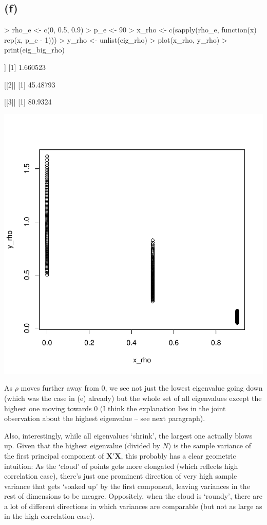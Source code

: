\documentclass[a4paper,12pt,twoside]{article}
\begin{document}
\subsection*{(f)}


\begin{Schunk}
\begin{Sinput}
> rho_e <- c(0, 0.5, 0.9)
> p_e <- 90
> x_rho <- c(sapply(rho_e, function(x) rep(x, p_e - 1)))
> y_rho <- unlist(eig_rho)
> plot(x_rho, y_rho)
> print(eig_big_rho)
\end{Sinput}
\begin{Soutput}
[[1]]
[1] 1.660523

[[2]]
[1] 45.48793

[[3]]
[1] 80.9324
\end{Soutput}
\end{Schunk}
\includegraphics{ps1-plot1}

As $\rho$ moves further away from $0$, we see not just the lowest eigenvalue 
going down (which was the case in (e) already) but the whole set of all eigenvalues 
except the highest one moving towards $0$ (I think the explanation lies
in the joint observation about the highest eigenvalue -- see next paragraph).

Also, interestingly, while all eigenvalues `shrink', the largest one actually blows up. 
Given that the highest eigenvalue (divided by $N$) is the sample variance of 
the first principal component of $\mathbf{X}' \mathbf{X}$, this probably has 
a clear geometric intuition: As the `cloud' of points gets more elongated 
(which reflects high correlation case), there's just one prominent direction of 
very high sample variance that gets `soaked up' by the first component,
leaving variances in the rest of dimensions to be meagre. Oppositely, 
when the cloud is `roundy', there are a lot of different directions in which 
variances are comparable (but not as large as in the high correlation case).
\end{document}
